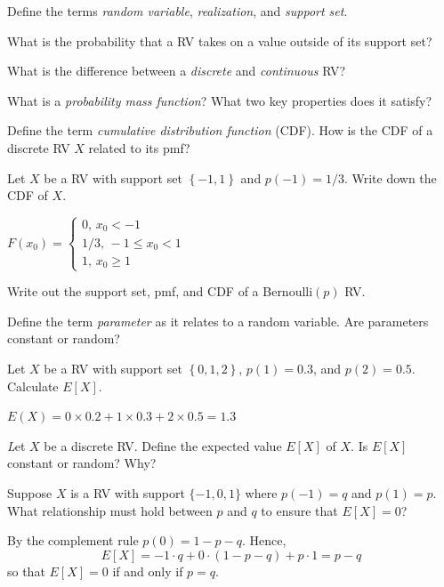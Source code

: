 \documentclass[addpoints,12pt]{exam}
\begin{document}
\begin{questions}
\question Define the terms \emph{random variable}, \emph{realization}, and \emph{support set}.

\question What is the probability that a RV takes on a value outside of its support set?

\question What is the difference between a \emph{discrete} and \emph{continuous} RV? 

\question What is a \emph{probability mass function}? What two key properties does it satisfy?

%

\question Define the term \emph{cumulative distribution function} (CDF).
How is the CDF of a discrete RV $X$ related to its pmf?

\question Let $X$ be a RV with support set $\left\{-1, 1 \right\}$ and $p(-1) = 1/3$.
Write down the CDF of $X$. 
\begin{solution}
$F(x_0) = \left\{\begin{array}{l} 0,\, x_0 < -1 \\ 1/3, \, -1 \leq x_0 < 1\\ 1,\, x_0 \geq 1\end{array} \right.$
\end{solution}

\question Write out the support set, pmf, and CDF of a Bernoulli$(p)$ RV.

\question Define the term \emph{parameter} as it relates to a random variable. Are parameters constant or random?

\question Let $X$ be a RV with support set $\left\{0, 1, 2 \right\}$, $p(1) = 0.3$, and $p(2) = 0.5$. Calculate $E[X]$.
\begin{solution}
  $E(X) = 0 \times 0.2 + 1 \times 0.3 + 2 \times 0.5 = 1.3$
\end{solution}


\emph Let $X$ be a discrete RV. Define the expected value $E[X]$ of $X$. Is $E[X]$ constant or random? Why?

\question Suppose $X$ is a RV with support $\{-1, 0, 1\}$ where $p(-1)=q$ and $p(1) = p$. What relationship must hold between $p$ and $q$ to ensure that $E[X] = 0$?
		\begin{solution}
				By the complement rule $p(0) = 1 - p - q$.
        Hence, 
        \[
          E[X] = -1 \cdot q + 0 \cdot (1-p-q) + p\cdot 1 = p-q
        \]
        so that $E[X] = 0$ if and only if $p = q$.
    \end{solution}


\end{questions}
\end{document}
